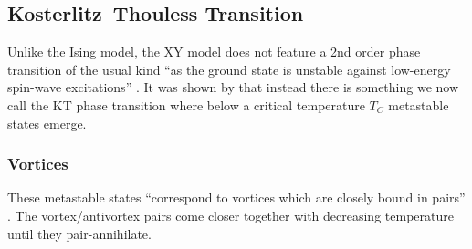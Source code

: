 	\subsection{Kosterlitz–Thouless Transition}
		Unlike the Ising model, the XY model does not feature a 2nd order phase transition of the usual kind \enquote{as the ground state is unstable against low-energy spin-wave excitations} \cite[p. 1190]{kosterlitz}. It was shown by \cite{kosterlitz} that instead there is something we now call the KT phase transition where below a critical temperature $T_C$ metastable states emerge.
	
		\subsubsection{Vortices}
			These metastable states \enquote{correspond to vortices which are closely bound in pairs} \cite[p. 1190]{kosterlitz}. The vortex/antivortex pairs come closer together with decreasing temperature until they pair-annihilate.